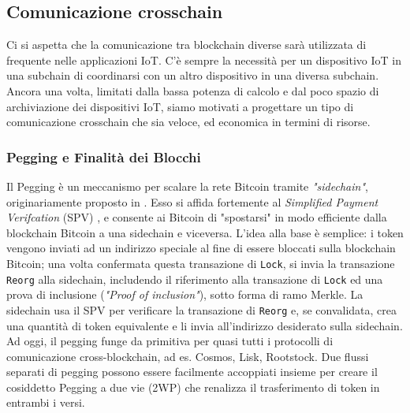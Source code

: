 \subsection{Comunicazione crosschain}
Ci si aspetta che la comunicazione tra blockchain diverse sarà utilizzata di frequente nelle applicazioni IoT. C'è sempre la necessità per un dispositivo IoT in una subchain di coordinarsi con un altro dispositivo in una diversa subchain. Ancora una volta, limitati dalla bassa potenza di calcolo e dal poco spazio di archiviazione dei dispositivi IoT, siamo motivati a progettare un tipo di comunicazione crosschain che sia veloce, ed economica in termini di risorse.

\subsubsection{Pegging e Finalità dei Blocchi}
Il Pegging è un meccanismo per scalare la rete Bitcoin tramite \emph{"sidechain"}, originariamente
proposto in \cite{c1}. Esso si affida fortemente al \emph{Simplified Payment Verifcation} (SPV) \cite{c21}, e consente ai Bitcoin di "spostarsi" in modo efficiente dalla blockchain Bitcoin a una sidechain
e viceversa. L'idea alla base è semplice: i token vengono inviati ad un indirizzo speciale al fine di essere bloccati sulla blockchain Bitcoin; una volta confermata questa transazione di \texttt{Lock}, si invia la transazione \texttt{Reorg} alla sidechain, includendo il riferimento alla transazione di \texttt{Lock} ed una prova di inclusione (\emph{"Proof of inclusion"}), sotto forma di ramo Merkle. La sidechain usa il SPV per verificare la transazione di \texttt{Reorg} e, se convalidata, crea una quantità di token equivalente e li invia all'indirizzo desiderato sulla sidechain. Ad oggi, il pegging funge da
primitiva per quasi tutti i protocolli di comunicazione cross-blockchain, ad es. Cosmos, Lisk,
Rootstock. Due flussi separati di pegging possono essere facilmente accoppiati insieme per creare il
cosiddetto Pegging a due vie (2WP) che renalizza il trasferimento di token in entrambi i versi.

